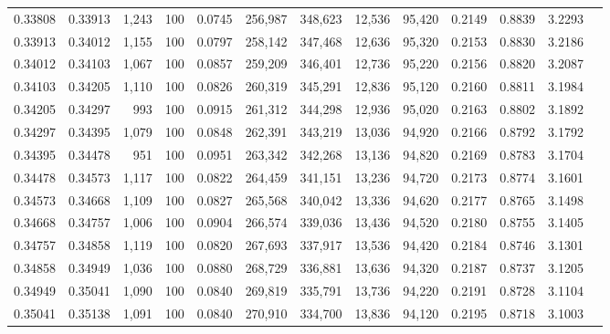 \begin{tabular}{rrrrrrrrrrrrr}
0.33808 & 0.33913 & 1,243 & 100 &                                     0.0745 & 256,987 & 348,623 &  12,536 &  95,420 & 0.2149 & 0.8839 & 3.2293 \\
0.33913 & 0.34012 & 1,155 & 100 &                                     0.0797 & 258,142 & 347,468 &  12,636 &  95,320 & 0.2153 & 0.8830 & 3.2186 \\
0.34012 & 0.34103 & 1,067 & 100 &                                     0.0857 & 259,209 & 346,401 &  12,736 &  95,220 & 0.2156 & 0.8820 & 3.2087 \\
0.34103 & 0.34205 & 1,110 & 100 &                                     0.0826 & 260,319 & 345,291 &  12,836 &  95,120 & 0.2160 & 0.8811 & 3.1984 \\
0.34205 & 0.34297 &   993 & 100 &                                     0.0915 & 261,312 & 344,298 &  12,936 &  95,020 & 0.2163 & 0.8802 & 3.1892 \\
0.34297 & 0.34395 & 1,079 & 100 &                                     0.0848 & 262,391 & 343,219 &  13,036 &  94,920 & 0.2166 & 0.8792 & 3.1792 \\
0.34395 & 0.34478 &   951 & 100 &                                     0.0951 & 263,342 & 342,268 &  13,136 &  94,820 & 0.2169 & 0.8783 & 3.1704 \\
0.34478 & 0.34573 & 1,117 & 100 &                                     0.0822 & 264,459 & 341,151 &  13,236 &  94,720 & 0.2173 & 0.8774 & 3.1601 \\
0.34573 & 0.34668 & 1,109 & 100 &                                     0.0827 & 265,568 & 340,042 &  13,336 &  94,620 & 0.2177 & 0.8765 & 3.1498 \\
0.34668 & 0.34757 & 1,006 & 100 &                                     0.0904 & 266,574 & 339,036 &  13,436 &  94,520 & 0.2180 & 0.8755 & 3.1405 \\
0.34757 & 0.34858 & 1,119 & 100 &                                     0.0820 & 267,693 & 337,917 &  13,536 &  94,420 & 0.2184 & 0.8746 & 3.1301 \\
0.34858 & 0.34949 & 1,036 & 100 &                                     0.0880 & 268,729 & 336,881 &  13,636 &  94,320 & 0.2187 & 0.8737 & 3.1205 \\
0.34949 & 0.35041 & 1,090 & 100 &                                     0.0840 & 269,819 & 335,791 &  13,736 &  94,220 & 0.2191 & 0.8728 & 3.1104 \\
0.35041 & 0.35138 & 1,091 & 100 &                                     0.0840 & 270,910 & 334,700 &  13,836 &  94,120 & 0.2195 & 0.8718 & 3.1003 \\

\end{tabular}
